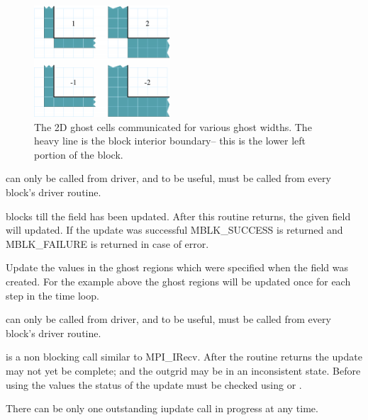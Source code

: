 \documentclass[10pt]{article}
\begin{document}
\begin{figure}[h]
\begin{center}
\includegraphics[width=2in]{fig/ghostwidth}
\end{center}
\caption{The 2D ghost cells communicated for various ghost widths.  The heavy line
is the block interior boundary-- this is the lower left portion of the block.}
\label{fig:ghostwidth}
\end{figure}      

      can only be called from driver, and to be useful,
     must be called from every block's driver routine.

      blocks till the field has been updated.
     After this routine returns, the given field will updated.
     If the update was successful MBLK\_SUCCESS is returned and 
     MBLK\_FAILURE is returned in case of error.

\vspace{0.2in}
     Update the values in the ghost regions which were specified when the
     field was created. For the example above the ghost regions will be 
     updated once for each step in the time loop.

      can only be called from driver, and to be useful,
     must be called from every block's driver routine.

      is a non blocking call similar to MPI\_IRecv.
     After the routine returns the update may not yet be complete; and the
     outgrid may be in an inconsistent state.  Before using the values the 
     status of the
     update must be checked using  or 
     .

     There can be only one outstanding iupdate call in progress at any time.
     
\end{document}
